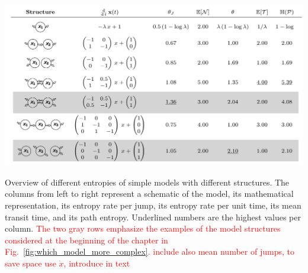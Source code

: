 \documentclass[smallextended]{svjour3}
\newcommand{\red}[1]{\textcolor{red}{#1}}
\begin{document}
\begin{table}[htbp]
  \centering
  \includegraphics[width=1.0\linewidth]{figs/entropy_table}
  \caption[Overview of different entropies of simple models with different structures.]{Overview of different entropies     of simple models with different structures.
  The columns from left to right represent a schematic of the model, its mathematical representation, its entropy rate per jump, its entropy rate per unit time, its mean transit time, and its path entropy.
  Underlined numbers are the highest values per column.
  \red{The two gray rows emphasize the examples of the model structures considered at the beginning of the chapter in Fig.~\ref{fig:which_model_more_complex}.}
  \red{include also mean number of jumps, to save space use $\dot{x}$, introduce in text}
  }
  \label{fig:entropy_table}
\end{table}
\end{document}
